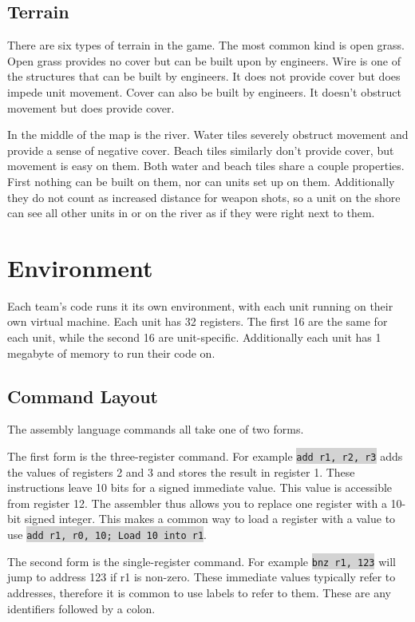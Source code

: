 \documentclass{article}
\newcommand{\vnscode}[1]{\colorbox{lightgray}{\lstinline[language=vns]{#1}}}
\begin{document}
\subsection{Terrain}

There are six types of terrain in the game. The most common kind is open grass.
Open grass provides no cover but can be built upon by engineers. Wire is one of
the structures that can be built by engineers. It does not provide cover but
does impede unit movement. Cover can also be built by engineers. It doesn't
obstruct movement but does provide cover.

In the middle of the map is the river. Water tiles severely obstruct movement
and provide a sense of negative cover. Beach tiles similarly don't provide
cover, but movement is easy on them. Both water and beach tiles share a couple
properties. First nothing can be built on them, nor can units set up on them.
Additionally they do not count as increased distance for weapon shots, so a unit
on the shore can see all other units in or on the river as if they were right
next to them.

\section{Environment}

Each team's code runs it its own environment, with each unit running on their
own virtual machine. Each unit has 32 registers. The first 16 are the same for
each unit, while the second 16 are unit-specific. Additionally each unit has 1
megabyte of memory to run their code on.

\subsection{Command Layout}

The assembly language commands all take one of two forms.

The first form is the three-register command. For example \vnscode{add r1, r2,
r3} adds the values of registers 2 and 3 and stores the result in register 1.
These instructions leave 10 bits for a signed immediate value. This value is
accessible from register 12.  The assembler thus allows you to replace one
register with a 10-bit signed integer. This makes a common way to load a
register with a value to use \vnscode{add r1, r0, 10; Load 10 into r1}.

The second form is the single-register command. For example \vnscode{bnz r1,
123} will jump to address 123 if r1 is non-zero. These immediate values
typically refer to addresses, therefore it is common to use labels to refer to
them. These are any identifiers followed by a colon.
\end{document}
